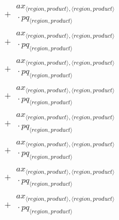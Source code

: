 \documentclass[11pt]{article}
\begin{document}
\begin{align*}
\begin{aligned}
\end{aligned}\\
&\quad {}+ \begin{aligned}
ax_{\langle region, product\rangle,\langle region, product\rangle}\\
{}\cdot pq_{\langle region, product\rangle}
\end{aligned}\\
&\quad {}+ \begin{aligned}
ax_{\langle region, product\rangle,\langle region, product\rangle}\\
{}\cdot pq_{\langle region, product\rangle}
\end{aligned}\\
&\quad {}+ \begin{aligned}
ax_{\langle region, product\rangle,\langle region, product\rangle}\\
{}\cdot pq_{\langle region, product\rangle}
\end{aligned}\\
&\quad {}+ \begin{aligned}
ax_{\langle region, product\rangle,\langle region, product\rangle}\\
{}\cdot pq_{\langle region, product\rangle}
\end{aligned}\\
&\quad {}+ \begin{aligned}
ax_{\langle region, product\rangle,\langle region, product\rangle}\\
{}\cdot pq_{\langle region, product\rangle}
\end{aligned}\\
&\quad {}+ \begin{aligned}
ax_{\langle region, product\rangle,\langle region, product\rangle}\\
{}\cdot pq_{\langle region, product\rangle}
\end{aligned}\\
&\quad {}+ \begin{aligned}
ax_{\langle region, product\rangle,\langle region, product\rangle}\\
{}\cdot pq_{\langle region, product\rangle}
\end{aligned}\\
&\quad {}+ \begin{aligned}
ax_{\langle region, product\rangle,\langle region, product\rangle}\\
{}\cdot pq_{\langle region, product\rangle}
\end{aligned}\\

\end{align*}
\end{document}
